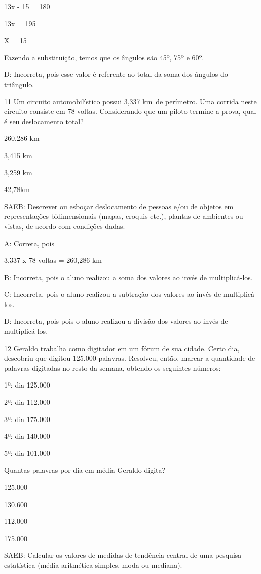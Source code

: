 {13x - 15 = 180

13x = 195

X = 15

Fazendo a substituição, temos que os ângulos são 45º, 75º e 60º.

D: Incorreta, pois esse valor é referente ao total da soma dos ângulos
do triângulo.

\num{11} Um circuito automobilístico possui 3,337 km~de perímetro. Uma
corrida neste circuito consiste em 78 voltas. Considerando que um piloto
termine a prova, qual é seu deslocamento total?
\item 260,286 km
\item 3,415 km
\item 3,259 km
\item 42,78km

SAEB: Descrever ou esboçar deslocamento de pessoas e/ou de objetos em
representações bidimensionais (mapas, croquis etc.), plantas de
ambientes ou vistas, de acordo com condições dadas.

A: Correta, pois

3,337 x 78 voltas = 260,286 km

B: Incorreta, pois o aluno realizou a soma dos valores ao invés de
multiplicá-los.

C: Incorreta, pois o aluno realizou a subtração dos valores ao invés de
multiplicá-los.

D: Incorreta, pois pois o aluno realizou a divisão dos valores ao invés
de multiplicá-los.

\num{12} Geraldo trabalha como digitador em um fórum de sua cidade. Certo
dia, descobriu que digitou 125.000 palavras. Resolveu, então, marcar a
quantidade de palavras digitadas no resto da semana, obtendo os
seguintes números:

1º: dia 125.000

2º: dia 112.000

3º: dia 175.000

4º: dia 140.000

5º: dia 101.000

Quantas palavras por dia em média Geraldo digita?
\item 125.000
\item 130.600
\item 112.000
\item 175.000

SAEB: Calcular os valores de medidas de tendência central de uma
pesquisa estatística (média aritmética simples, moda ou mediana).

}

